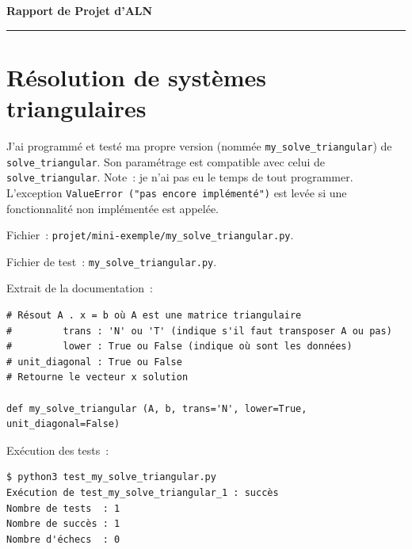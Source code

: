 \documentclass[11pt]{article}
\begin{document}
\begin{center}
\textbf{\bf Rapport de Projet d'ALN}
 
\end{center}
\medskip
\hrule
 
\bigskip

\section{Résolution de systèmes triangulaires}

J'ai programmé et testé ma propre version 
(nommée \texttt{my\_solve\_triangular}) de \texttt{solve\_triangular}. 
Son paramétrage est compatible avec celui de \texttt{solve\_triangular}.
Note~: je n'ai pas eu le temps de tout programmer.
L'exception \texttt{ValueError ("pas encore implémenté")} est
levée si une fonctionnalité non implémentée est appelée.

Fichier~: \texttt{projet/mini-exemple/my\_solve\_triangular.py}. 

Fichier de test~: \texttt{my\_solve\_triangular.py}.

Extrait de la documentation~:
\begin{Verbatim}[fontsize=\small]
# Résout A . x = b où A est une matrice triangulaire
#         trans : 'N' ou 'T' (indique s'il faut transposer A ou pas)
#         lower : True ou False (indique où sont les données)
# unit_diagonal : True ou False
# Retourne le vecteur x solution

def my_solve_triangular (A, b, trans='N', lower=True, unit_diagonal=False) 
\end{Verbatim}

Exécution des tests~:
\begin{lstlisting}
$ python3 test_my_solve_triangular.py 
Exécution de test_my_solve_triangular_1 : succès
Nombre de tests  : 1
Nombre de succès : 1
Nombre d'échecs  : 0
\end{lstlisting}
\end{document}
